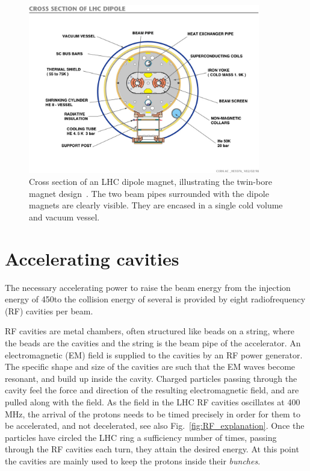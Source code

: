 \begin{figure}[t]
  \centering
  \includegraphics[width=0.9\textwidth,clip=true,trim=0 2cm 0 2cm]
  {figures/lhc/lhc_dipole_cross_section_cds841539.jpg} 
  \caption{Cross section of an LHC dipole magnet, illustrating the twin-bore magnet
design~\cite{cds:841539}. The two beam pipes surrounded with the dipole magnets are clearly
visible. They are encased in a single cold volume and vacuum vessel. 
  \label{fig:lhc_twin_bore}}
\end{figure}


\section{Accelerating cavities}

The necessary accelerating power to raise the beam energy from the injection energy of 450\GeV to
the collision energy of several \TeV is provided by eight radiofrequency (RF) cavities per beam. 

RF cavities are metal chambers, often structured like beads on a string, where the beads are the
cavities and the string is the beam pipe of the accelerator.
An electromagnetic (EM) field is supplied to the cavities by an RF power generator. The specific
shape and size of the cavities are such that the EM waves become resonant, and build up inside the
cavity. 
Charged particles passing through the cavity feel the force and direction of the resulting
electromagnetic field, and are pulled along with the field. 
As the field in the LHC RF cavities oscillates at 400 MHz, the arrival of the protons needs to be
timed precisely in order for them to be accelerated, and not decelerated, see also
Fig.~\ref{fig:RF_explanation}. 
Once the particles have circled the LHC ring a sufficiency number of times, passing through
the RF cavities each turn, they attain the desired energy. At this point the cavities are mainly
used to keep the protons inside their \textit{bunches}. 

